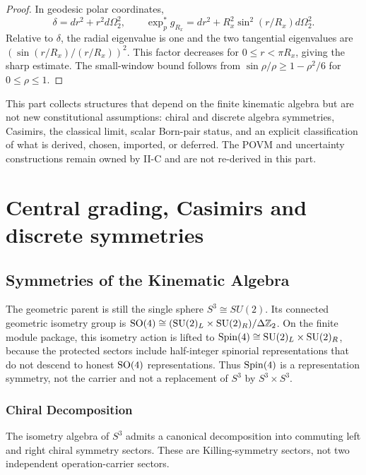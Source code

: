 \documentclass[12pt,a4paper]{article}
\begin{document}
\begin{proof}
In geodesic polar coordinates,
\[
 \delta=dr^2+r^2d\Omega_2^2,
 \qquad
 \exp_p^*g_{R_x}=dr^2+R_x^2\sin^2(r/R_x)d\Omega_2^2.
\]
Relative to \(\delta\), the radial eigenvalue is one and the two tangential
eigenvalues are
\((\sin(r/R_x)/(r/R_x))^2\).  This factor decreases for
\(0\le r<\pi R_x\), giving the sharp estimate.  The small-window bound
follows from \(\sin\rho/\rho\ge1-\rho^2/6\) for \(0\le\rho\le1\).
\end{proof}


\label{p2:part:symmetries-limits}

This part collects structures that depend on the finite kinematic algebra but
are not new constitutional assumptions: chiral and discrete algebra symmetries,
Casimirs, the classical limit, scalar Born-pair status, and an explicit
classification of what is derived, chosen, imported, or deferred.  The POVM
and uncertainty constructions remain owned by II-C and are not re-derived in
this part.


\section{Central grading, Casimirs and discrete symmetries}
\label{paper2d:sec:organized-symmetries}

\subsection{Symmetries of the Kinematic Algebra}
\label{p2:sec:symmetries}
The geometric parent is still the single sphere
$S^3\cong SU(2)$.  Its connected geometric isometry group is
$\mathrm{SO}(4)\cong(\mathrm{SU}(2)_L\times\mathrm{SU}(2)_R)/\Delta\mathbb{Z}_2$.  On the finite module
package, this isometry action is lifted to
$\mathrm{Spin}(4)\cong\mathrm{SU}(2)_L\times\mathrm{SU}(2)_R$, because the protected sectors include
half-integer spinorial representations that do not descend to honest
$\mathrm{SO}(4)$ representations.  Thus $\mathrm{Spin}(4)$ is a representation symmetry, not
the carrier and not a replacement of $S^3$ by $S^3\times S^3$.


\subsubsection{Chiral Decomposition}

The isometry algebra of $S^3$ admits a canonical decomposition into commuting
left and right chiral symmetry sectors.  These are Killing-symmetry sectors,
not two independent operation-carrier sectors.
\end{document}
